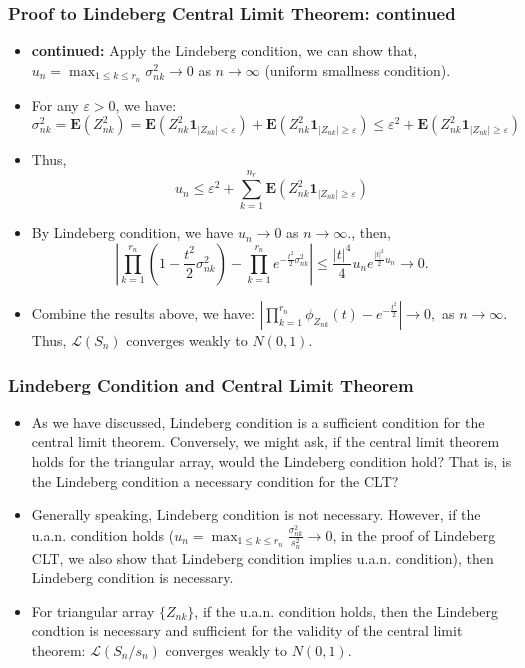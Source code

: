 \documentclass[handout]{beamer}
\newcommand{\BE}{\mathbf{E}}
\newcommand{\BI}{\mathbf{1}}
\begin{document}
      \frame
{
  \frametitle{Proof to Lindeberg Central Limit Theorem: continued}
   \begin{itemize}

\item<1->\textbf{continued:}  Apply the Lindeberg condition, we can show that, $u_n=\max_{1\leq k\leq r_n} \sigma_{nk}^2 \rightarrow 0$ as $n\rightarrow \infty$ (uniform smallness condition).

\item<2->[-] For any $\varepsilon>0$, we have:
$$\sigma_{nk}^2=\BE(Z_{nk}^2)=\BE(Z_{nk}^2 \BI_{|Z_{nk}|<\varepsilon})+\BE(Z_{nk}^2 \BI_{|Z_{nk}|\geq \varepsilon}) \leq \varepsilon^2+ \BE(Z_{nk}^2 \BI_{|Z_{nk}|\geq \varepsilon}) $$
\item<3->[-] Thus,
$$u_n\leq \varepsilon^2+ \sum_{k=1}^{n_r} \BE(Z_{nk}^2 \BI_{|Z_{nk}|\geq \varepsilon}) $$

\item<4->[-] By Lindeberg condition, we have $u_n\rightarrow 0$ as $n\rightarrow \infty.$, then,
$$|\prod_{k=1}^{r_n} (1-\frac{t^2}{2} \sigma^2_{nk})-\prod_{k=1}^{r_n} e^{-\frac{t^2}{2}\sigma^2_{nk}}| \leq \frac{|t|^4}{4} u_n  e^{\frac{|t|^2}{2} u_n} \rightarrow 0.$$

\item<5->[-] Combine the results above, we have: $ |\prod_{k=1}^{r_n} \phi_{Z_{nk}}(t)-e^{-\frac{t^2}{2}}| \rightarrow 0, $
as $n\rightarrow \infty$. Thus, $\mathcal{L} (S_n)$ converges weakly to $N(0,1)$.


 
\end{itemize}
}


      \frame
{
  \frametitle{Lindeberg Condition and Central Limit Theorem}
   \begin{itemize}

\item<1-> As we have discussed,  Lindeberg condition is a sufficient condition for the central limit theorem. Conversely, we might ask, if 
the central limit theorem holds for the triangular array, would the Lindeberg condition hold? That is, is the Lindeberg condition a necessary condition for the CLT? 

\item<2-> Generally speaking, Lindeberg condition is not necessary. However, if the u.a.n. condition holds ($u_n=\max_{1\leq k\leq r_n} \frac{\sigma_{nk}^2}{s_n^2} \rightarrow 0$, in the proof of Lindeberg CLT, we also show that Lindeberg condition implies u.a.n. condition), then Lindeberg condition is necessary. 

\item<3->[] \begin{Theorem} For triangular array $\{Z_{nk}\}$, if the u.a.n. condition holds, then the Lindeberg condtion is necessary and sufficient for the validity of the central limit theorem: $\mathcal{L} (S_n/s_n)$ converges weakly to $N(0,1)$.

\end{Theorem}

 
\end{itemize}
}
\end{document}
